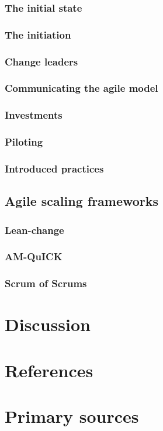 \documentclass{article}
\begin{document}
\subsubsection{The initial state}

\subsubsection{The initiation}

\subsubsection{Change leaders}

\subsubsection{Communicating the agile model}

\subsubsection{Investments}

\subsubsection{Piloting}

\subsubsection{Introduced practices}

\subsection{Agile scaling frameworks}

\subsubsection{Lean-change}

\subsubsection{AM-QuICK}

\subsubsection{Scrum of Scrums}



\section{Discussion}

\section{References}

\section{Primary sources}

\end{document}
